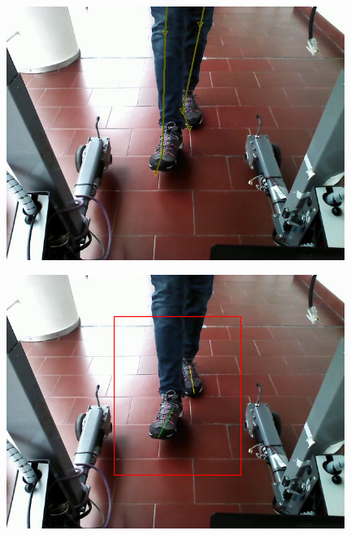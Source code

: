 \documentclass[a4paper]{report}
\begin{document}

\begin{figure}[H]
\centering
\begin{minipage}{.5\textwidth}
  \centering
    \includegraphics[width=0.98\textwidth]{images/building/results/frameGT30.png}
\end{minipage}%
\begin{minipage}{.5\textwidth}
  \centering
    \includegraphics[width=0.98\textwidth]{images/building/results/frame30.png}
    \label{img:Frame30}
\end{minipage}%
\end{figure}
\end{document}
